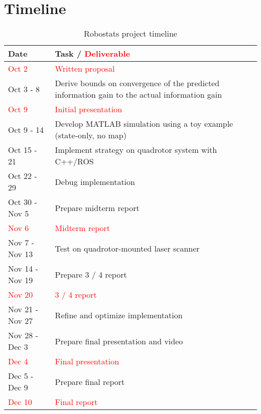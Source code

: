 \section{Timeline}

\begin{table}[!ht]
  \centering
  \caption{Robostats project timeline}
  \begin{tabular}{|l|p{13.5 cm} | } \hline
    \textbf{Date} & \textbf{Task / \textcolor{red}{Deliverable}} \\ \hline
            \textcolor{red}{Oct 2} & \textcolor{red}{Written proposal} \\ \hline
            Oct 3 - 8 & Derive bounds on convergence of the predicted information gain to the actual information gain \\ \hline
            \textcolor{red}{Oct 9} & \textcolor{red}{Initial presentation} \\ \hline
            Oct 9 - 14 & Develop MATLAB simulation using a toy example (state-only, no map) \\ \hline
            Oct 15 - 21 & Implement strategy on quadrotor system with C++/ROS \\ \hline
            Oct 22 - 29 & Debug implementation \\ \hline
            Oct 30 - Nov 5 & Prepare midterm report \\ \hline
            \textcolor{red}{Nov 6} & \textcolor{red}{Midterm report} \\ \hline
            Nov 7 - Nov 13 & Test on quadrotor-mounted laser scanner \\ \hline
            Nov 14 - Nov 19 & Prepare 3 / 4 report \\ \hline
           \textcolor{red}{Nov 20} & \textcolor{red}{3 / 4 report} \\ \hline
             Nov 21 - Nov 27 & Refine and optimize implementation \\ \hline
            Nov 28 - Dec 3 & Prepare final presentation and video \\ \hline
            \textcolor{red}{Dec 4} & \textcolor{red}{Final presentation} \\ \hline
            Dec 5 - Dec 9 & Prepare final report \\ \hline
           \textcolor{red}{Dec 10} & \textcolor{red}{Final report} \\ \hline
  \end{tabular}
  \label{tab:timeline}
\end{table}

